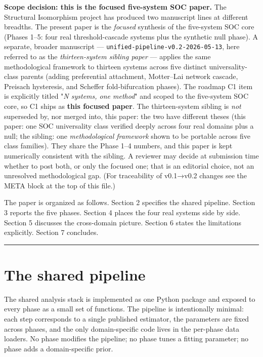 \documentclass[
  11pt]{article}
\begin{document}
\textbf{Scope decision: this is the focused five-system SOC paper.} The
Structural Isomorphism project has produced two manuscript lines at
different breadths. The present paper is the \emph{focused} synthesis of
the five-system SOC core (Phases 1--5: four real threshold-cascade
systems plus the synthetic null phase). A separate, broader manuscript
--- \texttt{unified-pipeline-v0.2-2026-05-13}, here referred to as the
\emph{thirteen-system sibling paper} --- applies the same methodological
framework to thirteen systems across five distinct universality-class
parents (adding preferential attachment, Motter--Lai network cascade,
Preisach hysteresis, and Scheffer fold-bifurcation phases). The roadmap
C1 item is explicitly titled "\emph{N systems, one method}" and scoped
to the five-system SOC core, so C1 ships as \textbf{this focused paper}.
The thirteen-system sibling is \emph{not} superseded by, nor merged
into, this paper: the two have different theses (this paper: one SOC
universality class verified deeply across four real domains plus a null;
the sibling: one \emph{methodological framework} shown to be portable
across five class families). They share the Phase 1--4 numbers, and this
paper is kept numerically consistent with the sibling. A reviewer may
decide at submission time whether to post both, or only the focused one;
that is an editorial choice, not an unresolved methodological gap. (For
traceability of v0.1→v0.2 changes see the META block at the top of this
file.)

The paper is organized as follows. Section 2 specifies the shared
pipeline. Section 3 reports the five phases. Section 4 places the four
real systems side by side. Section 5 discusses the cross-domain picture.
Section 6 states the limitations explicitly. Section 7 concludes.

\begin{center}\rule{0.5\linewidth}{0.5pt}\end{center}

\section{The shared pipeline}\label{sec:2}

The shared analysis stack is implemented as one Python package and
exposed to every phase as a small set of functions. The pipeline is
intentionally minimal: each step corresponds to a single published
estimator, the parameters are fixed across phases, and the only
domain-specific code lives in the per-phase data loaders. No phase
modifies the pipeline; no phase tunes a fitting parameter; no phase adds
a domain-specific prior.
\end{document}
